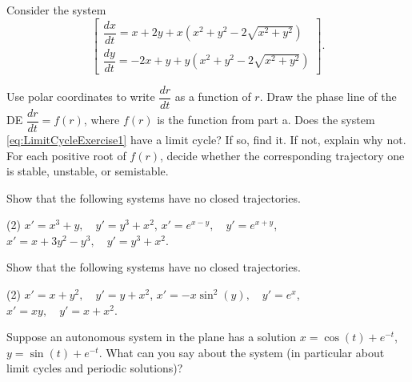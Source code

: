 \begin{exercise}
Consider the system %
\begin{equation}
\begin{bmatrix}\dfrac{dx}{dt}=x+2y+x(x^2+y^2-2\sqrt{x^2+y^2})\\[6pt]
  \dfrac{dy}{dt}=-2x+y+y(x^2+y^2-2\sqrt{x^2+y^2})
\end{bmatrix}. \label{eq:LimitCycleExercise1}
\end{equation}
\begin{tasks}
\task Use polar coordinates to write $\dfrac{dr}{dt}$ as a function of $r$.
\task Draw the phase line of the DE $\dfrac{dr}{dt}=f(r)$, where $f(r)$ is the function from part a.
\task Does the system \eqref{eq:LimitCycleExercise1} have a limit cycle? If so, find it. If not, explain why not.
For each positive root of $f(r)$, decide whether the corresponding trajectory one is stable, unstable, or semistable.
\end{tasks}
\end{exercise}

\begin{exercise}
Show that the following systems have no closed trajectories.
\begin{tasks}(2)
\task $x'=x^3+y,\quad y'=y^3+x^2$,
\task $x'=e^{x-y},\quad y'=e^{x+y}$,
\task $x'=x+3y^2-y^3,\quad y'=y^3+x^2$.
\end{tasks}
\end{exercise}

\begin{exercise}\ansMark%
Show that the following systems have no closed trajectories.
\begin{tasks}(2)
\task $x'=x+y^2,\quad y'=y+x^2$,
\task $x'=-x\sin^2(y),\quad y'=e^x$,
\task $x'=xy,\quad y'=x+x^2$.
\end{tasks}
\end{exercise}

\begin{exercise}\ansMark%
Suppose an autonomous system in the plane has a solution
$x=\cos(t)+e^{-t}$, $y=\sin(t)+e^{-t}$.  What can you say
about the system (in particular about limit cycles and periodic solutions)?
\end{exercise}

